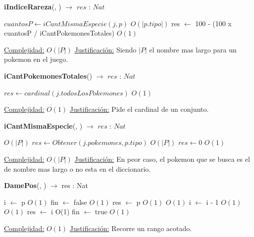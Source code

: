 \begin{algorithm}[H]{\textbf{iIndiceRareza}(, )  $\to$ $res$ : $Nat$} 
	{}
	\begin{algorithmic}
		\State $cuantosP \gets iCantMismaEspecie(j, p) $ \Comment $O(|p.tipo|)$
		\State res $\gets$ 100 - (100 x cuantosP / iCantPokemonesTotales)  \Comment $O(1)$
	
		\medskip
		\Statex \underline{Complejidad:} $O(|P|)$
		\Statex \underline{Justificación:} Siendo $|P|$ el nombre mas largo para un pokemon en el juego.
    \end{algorithmic}
\end{algorithm}

\begin{algorithm}[H]{\textbf{iCantPokemonesTotales}() $\to$ $res$ : $Nat$} 
	{}
	\begin{algorithmic}
		\State $res \gets cardinal(j.todosLosPokemones) $ \Comment $O(1)$
	
		\medskip
		\Statex \underline{Complejidad:} $O(1)$
		\Statex \underline{Justificación:} Pide el cardinal de un conjunto.
    \end{algorithmic}
\end{algorithm}

\begin{algorithm}[H]{\textbf{iCantMismaEspecie}(, ) $\to$ $res$ : $Nat$} 
	{}
	\begin{algorithmic}
		 \Comment $O(|P|)$
		\State $res \gets Obtener(j.pokemones, p.tipo)$ \Comment $O(|P|)$
		\Else
		\State $res \gets 0 $ \Comment $O(1)$
		\EndIf
	
		\medskip
		\Statex \underline{Complejidad:} $O(|P|)$
		\Statex \underline{Justificación:} En peor caso, el pokemon que se busca es el de nombre mas largo o no esta en el diccionario.
    \end{algorithmic}
\end{algorithm}

\begin{algorithm}[H]{\textbf{DamePos}(, ) $\to$ res : Nat} 
	{}
	\begin{algorithmic}
		\State i $\gets$ p	\Comment $O(1)$
		\State fin $\gets$ false	\Comment $O(1)$
		\State res $\gets$ p	\Comment $O(1)$
			\Comment $O(1)$
			\State i $\gets$ i - 1	\Comment $O(1)$
				\Comment $O(1)$
				\State res $\gets$ i \Comment O(1)
				\State fin $\gets$ true	\Comment $O(1)$
			\EndIf
		\EndWhile
	
		\medskip
		\Statex \underline{Complejidad:} $O(1)$
		\Statex \underline{Justificación:} Recorre un rango acotado.
    \end{algorithmic}
\end{algorithm}